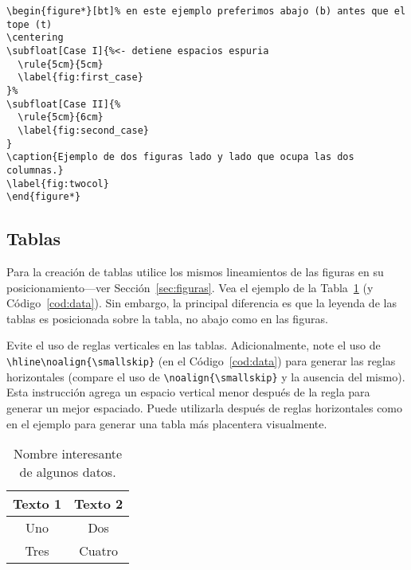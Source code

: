 \documentclass[twocolumn,11pts]{IEEEtran}
\begin{document}
\begin{lstlisting}[float=tb,caption={Código que produce la Figura~\ref{fig:twocol}.},label=cod:twocol]
\begin{figure*}[bt]% en este ejemplo preferimos abajo (b) antes que el tope (t)
\centering
\subfloat[Case I]{%<- detiene espacios espuria
  \rule{5cm}{5cm}
  \label{fig:first_case}
}%
\subfloat[Case II]{%
  \rule{5cm}{6cm}
  \label{fig:second_case}
}
\caption{Ejemplo de dos figuras lado y lado que ocupa las dos columnas.}
\label{fig:twocol}
\end{figure*}
\end{lstlisting}


\subsection{Tablas}

Para la creación de tablas utilice los mismos lineamientos de las figuras en su posicionamiento---ver Sección~\ref{sec:figuras}. Vea el ejemplo de la Tabla~\ref{tab:data} (y Código~\ref{cod:data}). Sin embargo, la principal diferencia es que la leyenda de las tablas es posicionada sobre la tabla, no abajo como en las figuras.

Evite el uso de reglas verticales en las tablas. Adicionalmente, note el uso de \verb|\hline\noalign{\smallskip}| (en el Código~\ref{cod:data}) para generar las reglas horizontales (compare el uso de \verb|\noalign{\smallskip}| y la ausencia del mismo). Esta instrucción agrega un espacio vertical menor después de la regla para generar un mejor espaciado. Puede utilizarla después de reglas horizontales como en el ejemplo para generar una tabla más placentera visualmente.

\begin{table}[t]%
\caption{Nombre interesante de algunos datos.}%
\label{tab:data}%
\centering
\begin{tabular}{cc}
\hline\noalign{\smallskip}%
\textbf{Texto 1} & \textbf{Texto 2}\\
\hline\noalign{\smallskip}
Uno & Dos\\
Tres & Cuatro\\
\hline
\end{tabular}
\end{table}
\end{document}

